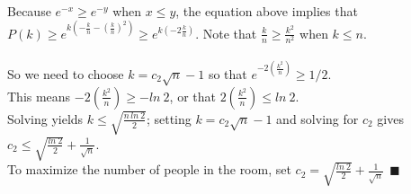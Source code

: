 \documentclass[11pt]{article}
\begin{document}
\begin{itemize}
\\
Because $e^{-x} \ge e^{-y}$ when $x \le y$, the equation above implies that \\
$P(k) \ge e^{k \left (- \frac{k}{n} - \left ( \frac{k}{n} \right )^{2} \right )} \ge e^{k \left (-2 \frac{k}{n} \right )}$.
Note that $\frac{k}{n} \ge \frac{k^{2}}{n^{2}}$ when $k \le n$.
\\
\\
So we need to choose $k = c_2 \sqrt{n} - 1$ so that $e^{-2 \left ( \frac{k^{2}}{n} \right )} \ge 1/2$. \\
This means $-2 \left ( \frac{k^{2}}{n} \right ) \ge -ln\ 2$, or that $2 \left ( \frac{k^{2}}{n} \right ) \le ln\ 2$. \\
Solving yields $k \le \sqrt{ \frac{n\,ln\ 2}{2}}$; setting $k = c_2 \sqrt{n} - 1$ and solving for $c_2$ gives \\ $c_2 \le \sqrt{ \frac{ln\ 2}{2}} + \frac{1}{\sqrt{n}}$. \\


To maximize the number of people in the room, set $c_2 = \sqrt{ \frac{ln\ 2}{2}} + \frac{1}{\sqrt{n}} \ \ \blacksquare $
\end{itemize}
\end{document}
